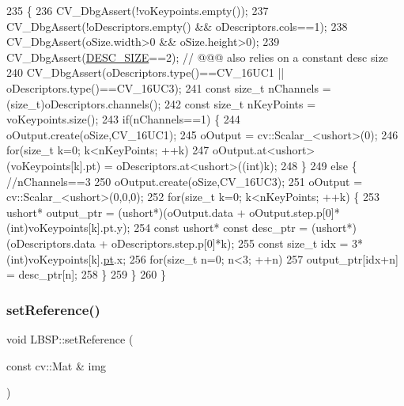 \begin{DoxyCode}
235                                                                                                            
                   \{
236     CV\_DbgAssert(!voKeypoints.empty());
237     CV\_DbgAssert(!oDescriptors.empty() && oDescriptors.cols==1);
238     CV\_DbgAssert(oSize.width>0 && oSize.height>0);
239     CV\_DbgAssert(\mbox{\hyperlink{class_l_b_s_p_a11167130ddc713921e5bbb0b628d5f74}{DESC\_SIZE}}==2); \textcolor{comment}{// @@@ also relies on a constant desc size}
240     CV\_DbgAssert(oDescriptors.type()==CV\_16UC1 || oDescriptors.type()==CV\_16UC3);
241     \textcolor{keyword}{const} \textcolor{keywordtype}{size\_t} nChannels = (size\_t)oDescriptors.channels();
242     \textcolor{keyword}{const} \textcolor{keywordtype}{size\_t} nKeyPoints = voKeypoints.size();
243     \textcolor{keywordflow}{if}(nChannels==1) \{
244         oOutput.create(oSize,CV\_16UC1);
245         oOutput = cv::Scalar\_<ushort>(0);
246         \textcolor{keywordflow}{for}(\textcolor{keywordtype}{size\_t} k=0; k<nKeyPoints; ++k)
247             oOutput.at<ushort>(voKeypoints[k].pt) = oDescriptors.at<ushort>((int)k);
248     \}
249     \textcolor{keywordflow}{else} \{ \textcolor{comment}{//nChannels==3}
250         oOutput.create(oSize,CV\_16UC3);
251         oOutput = cv::Scalar\_<ushort>(0,0,0);
252         \textcolor{keywordflow}{for}(\textcolor{keywordtype}{size\_t} k=0; k<nKeyPoints; ++k) \{
253             ushort* output\_ptr = (ushort*)(oOutput.data + oOutput.step.p[0]*(\textcolor{keywordtype}{int})voKeypoints[k].pt.y);
254             \textcolor{keyword}{const} ushort* \textcolor{keyword}{const} desc\_ptr = (ushort*)(oDescriptors.data + oDescriptors.step.p[0]*k);
255             \textcolor{keyword}{const} \textcolor{keywordtype}{size\_t} idx = 3*(int)voKeypoints[k].\mbox{\hyperlink{rings_8cpp_af69bbacaaf68a115b351c5d1e29c3cc8}{pt}}.x;
256             \textcolor{keywordflow}{for}(\textcolor{keywordtype}{size\_t} n=0; n<3; ++n)
257                 output\_ptr[idx+n] = desc\_ptr[n];
258         \}
259     \}
260 \}
\end{DoxyCode}
\mbox{\label{class_l_b_s_p_a0d35c4022d72d62e90b44507f7a979bf}} 
\subsubsection{\texorpdfstring{set\+Reference()}{setReference()}}
{\footnotesize\ttfamily void L\+B\+S\+P\+::set\+Reference (\begin{DoxyParamCaption}\item[{const cv\+::\+Mat \&}]{img }\end{DoxyParamCaption})\hspace{0.3cm}{\ttfamily [virtual]}}



